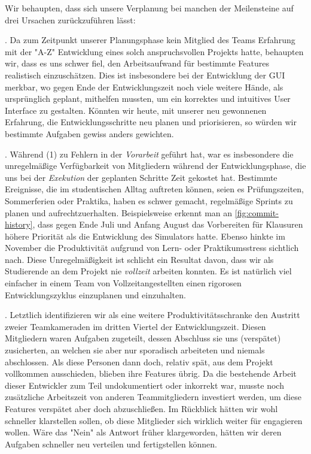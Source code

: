 \pagebreak
Wir behaupten, dass sich unsere Verplanung bei manchen der Meilensteine auf drei Ursachen zurückzuführen lässt:
\begin{senumerate}{-0.2cm}

  . Da zum Zeitpunkt
  unserer Planungsphase kein Mitglied des Teams Erfahrung mit der "A-Z"
  Entwicklung eines solch anspruchsvollen Projekts hatte, behaupten wir, dass es
  uns schwer fiel, den Arbeitsaufwand für bestimmte Features realistisch
  einzuschätzen. Dies ist insbesondere bei der Entwicklung der GUI merkbar, wo
  gegen Ende der Entwicklungszeit noch viele weitere Hände, als ursprünglich
  geplant, mithelfen mussten, um ein korrektes und intuitives User Interface zu
  gestalten. Könnten wir heute, mit unserer neu gewonnenen Erfahrung, die
  Entwicklungsschritte neu planen und priorisieren, so würden wir bestimmte
  Aufgaben gewiss anders gewichten.

  . Während (1) zu Fehlern in der
  \emph{Vorarbeit} geführt hat, war es insbesondere die unregelmäßige
  Verfügbarkeit von Mitgliedern während der Entwicklungsphase, die uns bei der
  \emph{Exekution} der geplanten Schritte Zeit gekostet hat. Bestimmte
  Ereignisse, die im studentischen Alltag auftreten können, seien es
  Prüfungszeiten, Sommerferien oder Praktika, haben es schwer gemacht,
  regelmäßige Sprints zu planen und aufrechtzuerhalten. Beispielsweise erkennt
  man an \autoref{fig:commit-history}, dass gegen Ende Juli und Anfang August
  das Vorbereiten für Klausuren höhere Priorität als die Entwicklung des
  Simulators hatte. Ebenso hinkte im November die Produktivität aufgrund von
  Lern- oder Praktikumsstress sichtlich nach. Diese Unregelmäßigkeit ist
  schlicht ein Resultat davon, dass wir als Studierende an dem Projekt nie
  \emph{vollzeit} arbeiten konnten. Es ist natürlich viel einfacher in einem
  Team von Vollzeitangestellten einen rigorosen Entwicklungszyklus einzuplanen
  und einzuhalten.

  . Letztlich identifizieren wir als eine
  weitere Produktivitätsschranke den Austritt zweier Teamkameraden im dritten
  Viertel der Entwicklungszeit. Diesen Mitgliedern waren Aufgaben zugeteilt,
  dessen Abschluss sie uns (verspätet) zusicherten, an welchen sie aber nur
  sporadisch arbeiteten und niemals abschlossen. Als diese Personen dann doch,
  relativ spät, aus dem Projekt vollkommen ausschieden, blieben ihre Features
  übrig. Da die bestehende Arbeit dieser Entwickler zum Teil undokumentiert oder
  inkorrekt war, musste noch zusätzliche Arbeitszeit von anderen Teammitgliedern
  investiert werden, um diese Features verspätet aber doch abzuschließen. Im
  Rückblick hätten wir wohl schneller klarstellen sollen, ob diese Mitglieder
  sich wirklich weiter für \erasim{} engagieren wollen. Wäre das "Nein" als
  Antwort früher klargeworden, hätten wir deren Aufgaben schneller neu verteilen
  und fertigstellen können.
  \vspace{-0.5cm}
\end{senumerate}
